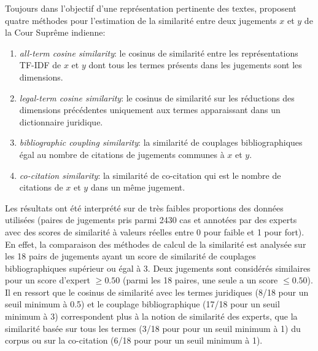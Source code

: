 Toujours dans l'objectif d'une représentation pertinente des textes, \citet{kumar2011judgmentsimilarity} proposent quatre méthodes pour l'estimation de la similarité entre deux jugements  $x$ et $y$ de la Cour Suprême indienne:
\begin{enumerate}
\item \textit{all-term cosine similarity}: le cosinus de similarité entre les représentations TF-IDF de $x$ et $y$ dont tous les termes présents dans les jugements sont les dimensions.
\item \textit{legal-term cosine similarity}: le cosinus de similarité sur les réductions des dimensions précédentes uniquement aux termes apparaissant dans un dictionnaire juridique.
\item  \textit{bibliographic coupling similarity}: la similarité de couplages bibliographiques égal au nombre de citations de jugements communes à $x$ et $y$.
\item \textit{co-citation similarity}: la similarité de co-citation qui est le nombre de citations de $x$ et $y$ dans un même jugement. 
\end{enumerate}

 
 Les résultats ont été interprété sur de très faibles proportions des données utilisées (paires de jugements pris parmi 2430 cas et annotées par des experts avec des scores de similarité à valeurs réelles entre 0 pour faible et 1 pour fort).%
 En effet, la comparaison des méthodes de calcul de la similarité est analysée sur les 18 pairs de jugements ayant un score de similarité de couplages bibliographiques supérieur ou égal à 3. Deux jugements sont considérés similaires pour un score d'expert $\geq 0.50$ (parmi les 18 paires, une seule a un score $\leq 0.50$). Il en ressort que le cosinus de similarité avec les termes juridiques (8/18 pour un seuil minimum à 0.5) et le couplage bibliographique (17/18 pour un seuil minimum à 3) correspondent plus à la notion de similarité des experts, que la similarité basée sur tous les termes (3/18 pour pour un seuil minimum à 1) du corpus ou sur la co-citation (6/18 pour pour un seuil minimum à 1). 

